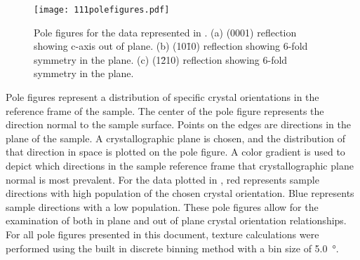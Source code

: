 \begin{figure}
	\centerline{\texttt{[image: 111polefigures.pdf]}}
		\caption[Pole figures for the data represented in ]{%
			Pole figures for the data represented in . 
	(a) (0001) reflection showing c-axis out of plane. (b) (10\={1}0) 
	reflection showing 6-fold symmetry in the plane. (c) (1\={2}10) 
	reflection showing 6-fold symmetry in the plane.}
	\label{fig:111polefigures}
\end{figure}
Pole figures represent a distribution of specific crystal orientations in the reference frame of the sample. The center of the pole figure represents the direction normal to the sample surface. Points on the edges are directions in the plane of the sample. A crystallographic plane is chosen, and the distribution of that direction in space is plotted on the pole figure. A color gradient is used to depict which directions in the sample reference frame that crystallographic plane normal is most prevalent. For the data plotted in , red represents sample directions with high population of the chosen crystal orientation. Blue represents sample directions with a low population. These pole figures allow for the examination of both in plane and out of plane crystal orientation relationships. For all pole figures presented in this document, texture calculations were performed using the built in discrete binning method with a bin size of \SI{5.0}{\degree}.

